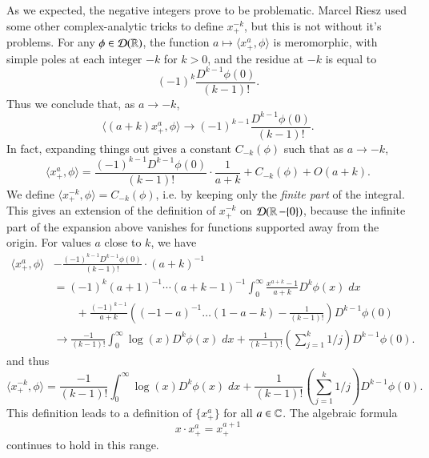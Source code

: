 \begin{example}
    As we expected, the negative integers prove to be problematic. Marcel Riesz used some other complex-analytic tricks to define $x^{-k}_+$, but this is not without it's problems. For any $\phi \in \operatorname{\mathcal{D}}(\operatorname{\mathbb{R}})$, the function $a \mapsto \langle x^a_+, \phi \rangle$ is meromorphic, with simple poles at each integer $-k$ for $k > 0$, and the residue at $-k$ is equal to
    \[ (-1)^k \frac{D^{k-1} \phi(0)}{(k-1)!}. \]
    Thus we conclude that, as $a \to -k$,
    \[ \langle (a + k) x^a_+, \phi \rangle \to (-1)^{k-1} \frac{D^{k-1} \phi(0)}{(k-1)!}. \]
    In fact, expanding things out gives a constant $C_{-k}(\phi)$ such that as $a \to -k$,
    \[ \langle x^a_+, \phi \rangle = \frac{(-1)^{k-1} D^{k-1} \phi(0)}{(k-1)!} \cdot \frac{1}{a + k} + C_{-k}(\phi) + O(a+k). \]
    We define $\langle x^{-k}_+, \phi \rangle = C_{-k}(\phi)$, i.e. by keeping only the \emph{finite part} of the integral. This gives an extension of the definition of $x^{-k}_+$ on $\operatorname{\mathcal{D}}(\operatorname{\mathbb{R}} - \{ 0 \})$, because the infinite part of the expansion above vanishes for functions supported away from the origin. For values $a$ close to $k$, we have
    \begin{align*} \langle x^a_+, \phi \rangle &- \frac{(-1)^{k-1} D^{k-1} \phi(0)}{(k-1)!} \cdot (a+k)^{-1}\\
        &= (-1)^k (a+1)^{-1} \cdots (a+k-1)^{-1} \int_0^\infty \frac{x^{a + k} - 1}{a+k} D^k \phi(x)\; dx\\
        &\quad\quad + \frac{(-1)^{k-1}}{a+k} \left( (-1-a)^{-1} \dots (1-a-k) - \frac{1}{(k-1)!} \right) D^{k-1} \phi(0)\\
        &\to \frac{-1}{(k-1)!} \int_0^\infty \log(x) D^k \phi(x)\; dx + \frac{1}{(k-1)!} \left(\sum_{j = 1}^k 1/j \right) D^{k-1} \phi(0).
    \end{align*}
    and thus
    \[ \langle x^{-k}_+, \phi \rangle = \frac{-1}{(k-1)!} \int_0^\infty \log(x) D^k \phi(x)\; dx + \frac{1}{(k-1)!} \left(\sum_{j = 1}^k 1/j \right) D^{k-1} \phi(0). \]
    This definition leads to a definition of $\{ x^a_+ \}$ for all $a \in \operatorname{\mathbb{C}}$. The algebraic formula
    \[ x \cdot x^a_+ = x^{a+1}_+ \]
    continues to hold in this range.


\end{example}
